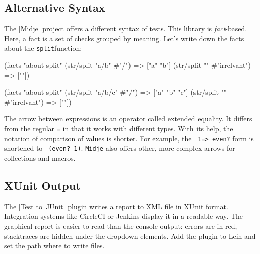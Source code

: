 \subsection{Alternative Syntax}


The [Midje] project offers a different syntax of tests. This library is \emph{fact}-based. Here, a fact is a set of checks grouped by meaning. Let's write down the facts about the \verb|split|function:

\ifnarrow

\begin{english}
  \begin{clojure}
(facts "about split"
 (str/split "a/b" #"/") => ["a" "b"]
 (str/split "" #"irrelvant") => [""])
  \end{clojure}
\end{english}

\else

\begin{english}
  \begin{clojure}
(facts "about split"
 (str/split "a/b/c" #"/") => ["a" "b" "c"]
 (str/split "" #"irrelvant") => [""])
  \end{clojure}
\end{english}

\fi


The arrow between expressions is an operator called extended equality. It differs from the regular \verb|=| in that it works with different types. With its help, the notation of comparison of values is shorter. For example, the \verb| 1=> even?| form is shortened to \verb| (even? 1)|. \verb|Midje| also offers other, more complex arrows for collections and macros.

\subsection{XUnit Output}


The [Test to~JUnit] plugin writes a report to XML file in XUnit format. Integration systems like CircleCI or Jenkins display it in a readable way. The graphical report is easier to read than the console output: errors are in red, stacktraces are hidden under the dropdown elements. Add the plugin to Lein and set the path where to write files.

